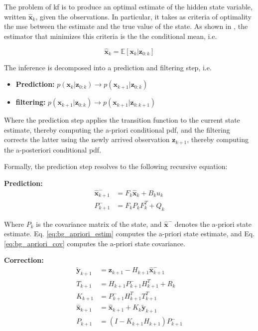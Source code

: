 The problem of \gls{kf} is to produce an optimal estimate of the hidden state variable, written $\bm{\hat x}_{k}$, given the observations.
In particular, it takes as criteria of optimality the \gls{mse} between the estimate and the true value of the state.
As shown in \cite{ribeiro04}, the estimator that minimizes this criteria is the the conditional mean, i.e.

\begin{equation}
  \label{eq:bg_cond_mean}
  \bm{\hat x}_{k} = \mathbb{E}[\bm{x}_{k}|\bm{z}_{0:k}]
\end{equation}

The inference is decomposed into a prediction and filtering step, i.e.

\begin{itemize}
    \item \textbf{Prediction: } $p(\bm{x}_{k}|\bm{z}_{0:k}) \rightarrow p(\bm{x}_{k+1}|\bm{z}_{0:k})$
    \item \textbf{filtering: } $p(\bm{x}_{k+1}|\bm{z}_{0:k}) \rightarrow p(\bm{x}_{k+1}|\bm{z}_{0:k+1})$
\end{itemize}

Where the prediction step applies the transition function to the current state estimate, thereby computing the a-priori conditional \gls{pdf}, and the filtering corrects the latter using the newly arrived observation $\bm{z}_{k+1}$, thereby computing the a-posteriori conditional \gls{pdf}.

Formally, the prediction step resolves to the following recursive equation:

\textbf{Prediction:}
\begin{align}
  \bm{\hat x}^{-}_{k+1}&=F_{k} \bm{\hat x}_{k} + B_{k}u_{k} \label{eq:bg_apriori_estim}\\
  P_{k+1}^{-}&=F_{k} P_{k} F_{k}^{T} + Q_{k} \label{eq:bg_apriori_cov}
\end{align}

Where $P_{k}$ is the covariance matrix of the state, and $\bm{\hat x}^{-}$ denotes the a-priori state estimate.
Eq. \ref{eq:bg_apriori_estim} computes the a-priori state estimate, and Eq. \ref{eq:bg_apriori_cov} computes the a-priori state covariance.

\textbf{Correction:}
\begin{align}
  \bm{\tilde y}_{k+1} &= \bm{z}_{k+1} - H_{k+1} \bm{\hat x}_{k+1}^{-} \label{eq:bg_innov} \\
  T_{k+1} &= H_{k+1} P_{k+1}^{-} H_{k+1}^{T} + R_{k} \label{eq:bg_innov_cov} \\
  K_{k+1} &= P_{k+1}^{-} H_{k+1}^{T} T_{k+1}^{T} \label{eq:bg_kf_gain}\\
  \bm{\hat x}_{k+1} &= \bm{\hat x}_{k+1} + K_{k} \bm{\tilde y}_{k+1} \label{eq:bg_aposteriori_state_estim}\\
  P_{k+1} &= (I - K_{k+1}H_{k+1}) P_{k+1}^{-} \label{eq:bg_aposteriori_cov_estim}
\end{align}

